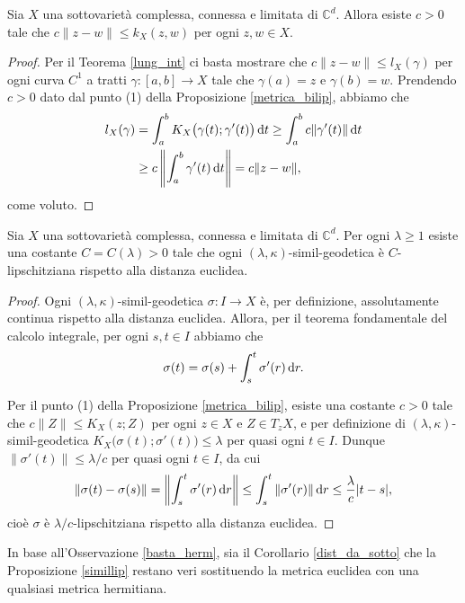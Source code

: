 \begin{cor} \label{dist_da_sotto}
    Sia $X$ una sottovarietà complessa, connessa e limitata di $\mathbb{C}^d$. Allora esiste $c>0$ tale che $c\|z-w\| \le k_X(z,w)$ per ogni $z,w \in X$.
\end{cor}

\begin{proof}
    Per il Teorema \ref{lung_int} ci basta mostrare che $c\|z-w\| \le l_X(\gamma)$ per ogni curva $C^1$ a tratti $\gamma:[a,b] \longrightarrow X$ tale che $\gamma(a)=z$ e $\gamma(b)=w$. Prendendo $c>0$ dato dal punto (1) della Proposizione \ref{metrica_bilip}, abbiamo che
    \begin{align*}
        l_X(\gamma)&=\int_a^b K_X\big(\gamma(t);\gamma'(t)\big)\mathop{}\!\mathrm{d} t \ge \int_a^b c\|\gamma'(t)\|\mathop{}\!\mathrm{d} t\\
        &\ge c\left\|\int_a^b \gamma'(t)\mathop{}\!\mathrm{d} t\right\|=c\|z-w\|,
    \end{align*}
    come voluto.
\end{proof}

\begin{prop} \label{simillip}
    Sia $X$ una sottovarietà complessa, connessa e limitata di $\mathbb{C}^d$. Per ogni $\lambda \ge 1$ esiste una costante $C=C(\lambda)>0$ tale che ogni $(\lambda,\kappa)$-simil-geodetica è $C$-lipschitziana rispetto alla distanza euclidea.
\end{prop}

\begin{proof}
    Ogni $(\lambda,\kappa)$-simil-geodetica $\sigma:I\longrightarrow X$ è, per definizione, assolutamente continua rispetto alla distanza euclidea. Allora, per il teorema fondamentale del calcolo integrale, per ogni $s,t\in I$ abbiamo che
    $$\sigma(t)=\sigma(s)+\int_s^t\sigma'(r)\mathop{}\!\mathrm{d} r.$$
    
    Per il punto (1) della Proposizione \ref{metrica_bilip}, esiste una costante $c>0$ tale che $c\|Z\| \le K_X(z;Z)$ per ogni $z\in X$ e $Z\in T_zX$, e per definizione di $(\lambda,\kappa)$-simil-geodetica $K_X\big(\sigma(t);\sigma'(t)\big) \le \lambda$ per quasi ogni $t\in I$. Dunque $\|\sigma'(t)\| \le \lambda/c$ per quasi ogni $t\in I$, da cui
    $$\|\sigma(t)-\sigma(s)\| =\left\|\int_s^t\sigma'(r)\mathop{}\!\mathrm{d} r\right\| \le \int_s^t\|\sigma'(r)\|\mathop{}\!\mathrm{d} r \le \frac{\lambda}{c}|t-s|,$$
    cioè $\sigma$ è $\lambda/c$-lipschitziana rispetto alla distanza euclidea.
\end{proof}

\begin{oss}
    In base all'Osservazione \ref{basta_herm}, sia il Corollario \ref{dist_da_sotto} che la Proposizione \ref{simillip} restano veri sostituendo la metrica euclidea con una qualsiasi metrica hermitiana.
\end{oss}

